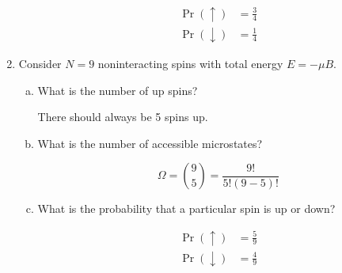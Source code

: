 \documentclass[9pt,a4paper,twocolumn]{article}
\begin{document}
\begin{enumerate}[1.]
\begin{enumerate}[(a)]
		\begin{align}
			\Pr(\uparrow) &= \frac{3}{4} \\
			\Pr(\downarrow) &= \frac{1}{4}
		\end{align}
	
	\end{enumerate}
	
	\item Consider $N=9$ noninteracting spins with total energy $E = -\mu B$.
	\begin{enumerate}[(a)]
	
		\item What is the number of up spins?
		
		There should always be 5 spins up.
		
		\item What is the number of accessible microstates?
		
		\begin{equation}
			\Omega = \binom{9}{5} = \frac{9!}{5!(9-5)!}
		\end{equation}
		
		\item What is the probability that a particular spin is up or down?
		
		\begin{align}
			\Pr(\uparrow) &= \frac{5}{9} \\
			\Pr(\downarrow) &= \frac{4}{9}
		\end{align}
	
	\end{enumerate}

\end{enumerate}
\end{document}
